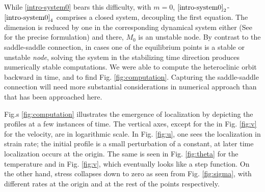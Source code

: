 \documentclass[a4paper,11pt]{article}
\theoremstyle{remark}
\begin{document}
While \eqref{intro-system0} bears this difficulty, with $m=0$, $\eqref{intro-system0}_2$-$\eqref{intro-system0}_4$ comprises a closed system, decoupling the first equation. The dimension is reduced by one in the corresponding dynamical system either (See \cite{KLT_HYP2016} for the precise formulation) and there, $M_0$ is an unstable node. By contrast to the saddle-saddle connection, in cases one of the equilibrium points is a stable or unstable {\it node}, solving the system in the stabilizing time direction produces numerically stable computations. We were able to compute the heteroclinic orbit backward in time, and to find Fig. \ref{fig:computation}. Capturing the saddle-saddle connection will need more substantial considerations in numerical approach than that has been approached here.


Fig.s \ref{fig:computation} illustrates the emergence of localization by depicting the profiles at a few instances of time. The vertical axes, except for the in Fig. \ref{fig:v} for the velocity, are in logarithmic scale. In Fig. \ref{fig:u}, one sees the localization in strain rate; the initial profile is a small perturbation of
a constant, at later time localization occurs at the origin. The same is seen in Fig. \ref{fig:theta} 
for the temperature and in  Fig. \ref{fig:v}, which eventually looks like a step function. On the other hand, stress collapses down to zero as seen from Fig. \ref{fig:sigma}, with different rates at the origin and at the rest of the points respectively.








\vfil\eject


\appendix
\end{document}
